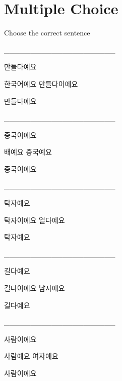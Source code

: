 \documentclass[addpoints, 30pt]{../exam}%
\begin{document}
\section{Multiple Choice}%
Choose the correct sentence%
\begin{questions}%
\question[1]%
\_\_\_\_\_\_\_\_\_\_\_\_\_\_\_\_\_\_\_\_\_%
\begin{choices}%
\begin{solution}%
만들다예요%
\end{solution}%
\CorrectChoice%
한국어예요%
\choice%
만들다이에요%
\end{choices}%
\begin{solution}%
만들다예요%
\end{solution}%
\question[1]%
\_\_\_\_\_\_\_\_\_\_\_\_\_\_\_\_\_\_\_\_\_%
\begin{choices}%
\begin{solution}%
중국이에요%
\end{solution}%
\CorrectChoice%
배예요%
\choice%
중국예요%
\end{choices}%
\begin{solution}%
중국이에요%
\end{solution}%
\question[1]%
\_\_\_\_\_\_\_\_\_\_\_\_\_\_\_\_\_\_\_\_\_%
\begin{choices}%
\begin{solution}%
탁자예요%
\end{solution}%
\choice%
탁자이에요%
\CorrectChoice%
열다예요%
\end{choices}%
\begin{solution}%
탁자예요%
\end{solution}%
\question[1]%
\_\_\_\_\_\_\_\_\_\_\_\_\_\_\_\_\_\_\_\_\_%
\begin{choices}%
\begin{solution}%
길다예요%
\end{solution}%
\choice%
길다이에요%
\CorrectChoice%
남자예요%
\end{choices}%
\begin{solution}%
길다예요%
\end{solution}%
\question[1]%
\_\_\_\_\_\_\_\_\_\_\_\_\_\_\_\_\_\_\_\_\_%
\begin{choices}%
\begin{solution}%
사람이에요%
\end{solution}%
\choice%
사람예요%
\CorrectChoice%
여자예요%
\end{choices}%
\begin{solution}%
사람이에요%
\end{solution}%

\end{questions}
\end{document}
